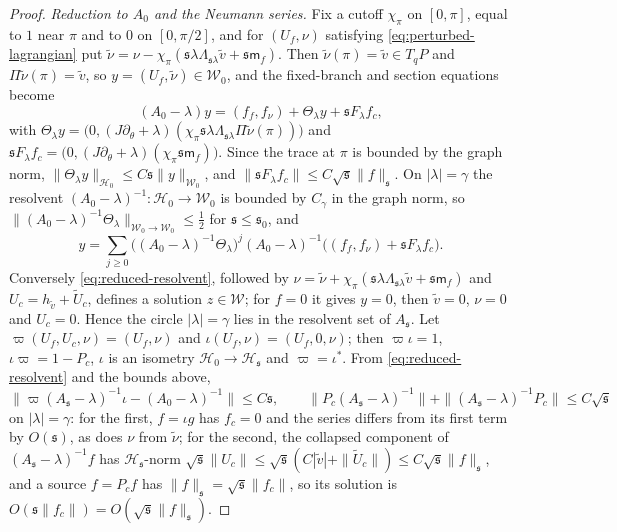 \documentclass[11pt]{amsart}
\theoremstyle{definition}
\theoremstyle{remark}
\theoremstyle{plain}
\numberwithin{equation}{section}
\begin{document}
\begin{proof}
\emph{Reduction to $A_0$ and the Neumann series.} Fix a cutoff $\chi_\pi$ on $[0,\pi]$,
equal to $1$ near $\pi$ and to $0$ on $[0,\pi/2]$, and for $(U_f,\nu)$ satisfying
\eqref{eq:perturbed-lagrangian} put $\tilde\nu=\nu-\chi_\pi({\mathfrak s}\lambda\Lambda_{{\mathfrak s}\lambda}\tilde
v+{\mathfrak s}\mathsf m_f)$. Then $\tilde\nu(\pi)=\tilde v\in T_qP$ and $\Pi\tilde\nu(\pi)=\tilde v$, so
$y=(U_f,\tilde\nu)\in\mathcal W_0$, and the fixed-branch and section equations become
\[
(A_0-\lambda)y=(f_f,f_\nu)+\Theta_\lambda y+{\mathfrak s} F_\lambda f_c,
\]
with $\Theta_\lambda y=\bigl(0,(J\partial_\theta+\lambda)(\chi_\pi{\mathfrak s}\lambda
\Lambda_{{\mathfrak s}\lambda}\Pi\tilde\nu(\pi))\bigr)$ and ${\mathfrak s} F_\lambda f_c=\bigl(0,(J\partial_\theta
+\lambda)(\chi_\pi{\mathfrak s}\mathsf m_f)\bigr)$. Since the trace at $\pi$ is bounded by the graph
norm, $\|\Theta_\lambda y\|_{\mathcal H_0}\le C{\mathfrak s}\|y\|_{\mathcal W_0}$, and $\|{\mathfrak s}
F_\lambda f_c\|\le C\sqrt{\mathfrak s}\|f\|_{\mathfrak s}$. On $|\lambda|=\gamma$ the resolvent
$(A_0-\lambda)^{-1}\colon\mathcal H_0\to\mathcal W_0$ is bounded by $C_\gamma$ in the graph
norm, so $\|(A_0-\lambda)^{-1}\Theta_\lambda\|_{\mathcal W_0\to\mathcal W_0}\le\frac12$ for
${\mathfrak s}\le{\mathfrak s}_0$, and
\begin{equation}\label{eq:reduced-resolvent}
y=\sum_{j\ge0}\bigl((A_0-\lambda)^{-1}\Theta_\lambda\bigr)^j(A_0-\lambda)^{-1}
\bigl((f_f,f_\nu)+{\mathfrak s} F_\lambda f_c\bigr).
\end{equation}
Conversely \eqref{eq:reduced-resolvent}, followed by
$\nu=\tilde\nu+\chi_\pi({\mathfrak s}\lambda\Lambda_{{\mathfrak s}\lambda}\tilde v+{\mathfrak s}\mathsf m_f)$ and
$U_c=h_{\tilde v}+\tilde U_c$, defines a solution $z\in\mathcal W$; for $f=0$ it gives
$y=0$, then $\tilde v=0$, $\nu=0$ and $U_c=0$. Hence the circle $|\lambda|=\gamma$ lies in
the resolvent set of $A_{\mathfrak s}$. Let $\varpi(U_f,U_c,\nu)=(U_f,\nu)$ and
$\iota(U_f,\nu)=(U_f,0,\nu)$; then $\varpi\iota=1$, $\iota\varpi=1-P_c$, $\iota$ is an
isometry $\mathcal H_0\to\mathcal H_{\mathfrak s}$ and $\varpi=\iota^*$. From
\eqref{eq:reduced-resolvent} and the bounds above,
\[
\|\varpi(A_{\mathfrak s}-\lambda)^{-1}\iota-(A_0-\lambda)^{-1}\|\le C{\mathfrak s},\qquad
\|P_c(A_{\mathfrak s}-\lambda)^{-1}\|+\|(A_{\mathfrak s}-\lambda)^{-1}P_c\|\le C\sqrt{\mathfrak s}
\]
on $|\lambda|=\gamma$: for the first, $f=\iota g$ has $f_c=0$ and the series differs from its
first term by $O({\mathfrak s})$, as does $\nu$ from $\tilde\nu$; for the second, the collapsed
component of $(A_{\mathfrak s}-\lambda)^{-1}f$ has $\mathcal H_{\mathfrak s}$-norm
$\sqrt{\mathfrak s}\|U_c\|\le\sqrt{\mathfrak s}(C|\tilde v|+\|\tilde U_c\|)\le C\sqrt{\mathfrak s}\|f\|_{\mathfrak s}$, and a source
$f=P_cf$ has $\|f\|_{\mathfrak s}=\sqrt{\mathfrak s}\|f_c\|$, so its solution is $O({\mathfrak s}\|f_c\|)=O(\sqrt{\mathfrak s}\|f\|_{\mathfrak s})$.


\end{proof}
\end{document}
